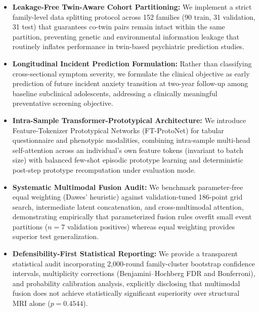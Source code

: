 \documentclass[10pt,letterpaper]{article}
\begin{document}
        \begin{itemize}
        
        \item \textbf{Leakage-Free Twin-Aware Cohort Partitioning:} We implement a strict family-level data splitting protocol across 152 families (90 train, 31 validation, 31 test) that guarantees co-twin pairs remain intact within the same partition, preventing genetic and environmental information leakage that routinely inflates performance in twin-based psychiatric prediction studies.
        
        \item \textbf{Longitudinal Incident Prediction Formulation:} Rather than classifying cross-sectional symptom severity, we formulate the clinical objective as early prediction of future incident anxiety transition at two-year follow-up among baseline subclinical adolescents, addressing a clinically meaningful preventative screening objective.
        
        \item \textbf{Intra-Sample Transformer-Prototypical Architecture:} We introduce Feature-Tokenizer Prototypical Networks (FT-ProtoNet) for tabular questionnaire and phenotypic modalities, combining intra-sample multi-head self-attention across an individual's own feature tokens (invariant to batch size) with balanced few-shot episodic prototype learning and deterministic post-step prototype recomputation under evaluation mode.
        
        \item \textbf{Systematic Multimodal Fusion Audit:} We benchmark parameter-free equal weighting (Dawes' heuristic) against validation-tuned 186-point grid search, intermediate latent concatenation, and cross-multimodal attention, demonstrating empirically that parameterized fusion rules overfit small event partitions ($n=7$ validation positives) whereas equal weighting provides superior test generalization.
        
        \item \textbf{Defensibility-First Statistical Reporting:} We provide a transparent statistical audit incorporating 2,000-round family-cluster bootstrap confidence intervals, multiplicity corrections (Benjamini--Hochberg FDR and Bonferroni), and probability calibration analysis, explicitly disclosing that multimodal fusion does not achieve statistically significant superiority over structural MRI alone ($p = 0.4544$).
        
        \end{itemize}
\end{document}
